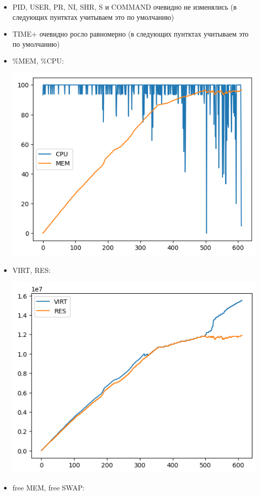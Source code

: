 \documentclass[10pt, a4paper]{article}
\begin{document}
\begin{itemize}
    \item PID, USER, PR, NI, SHR, S и COMMAND очевидно не изменялись (в следующих пунтктах учитываем это по умолчанию)
    \item TIME+ очевидно росло равномерно (в следующих пунтктах учитываем это по умолчанию)
    \item \%MEM, \%CPU:

    \includegraphics[scale=0.8]{graphs/1.png}
    \item VIRT, RES:
    
    \includegraphics[scale=0.8]{graphs/2.png}
    \item free MEM, free SWAP:
    

\end{itemize}
\end{document}
